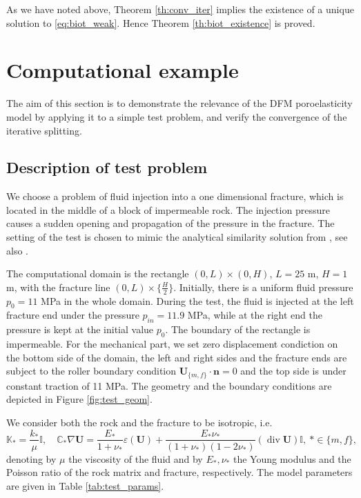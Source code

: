 \documentclass[a4paper]{article}
\numberwithin{equation}{section}
\def\div{\operatorname{div}}
\def\nn{\vc n}
\def\tn#1{{\mathbb{#1}}}    %
\def\U{\vc U}
\def\vc#1{\mathbf{#1}}     %
\newcommand{\eq}[1]{\begin{equation}#1\end{equation}}
\begin{document}
% 
As we have noted above, Theorem \ref{th:conv_iter} implies the existence of a unique solution to \eqref{eq:biot_weak}.
Hence Theorem \ref{th:biot_existence} is proved.


\section{Computational example}\label{sec:comp_test}

The aim of this section is to demonstrate the relevance of the DFM poroelasticity model by applying it to a simple test problem, and verify the convergence of the iterative splitting.

\subsection{Description of test problem}
We choose a problem of fluid injection into a one dimensional fracture, which is located in the middle of a block of impermeable rock.
The injection pressure causes a sudden opening and propagation of the pressure in the fracture.
The setting of the test is chosen to mimic the analytical similarity solution from \cite{Wijesinghe1986}, see also \cite{Watanabe2012lower}.

The computational domain is the rectangle $(0,L)\times(0,H)$, $L=25$ m, $H=1$ m, with the fracture line $(0,L)\times\{\tfrac H2\}$.
Initially, there is a uniform fluid pressure $p_0=11$ MPa in the whole domain.
During the test, the fluid is injected at the left fracture end under the pressure $p_{in}=11.9$ MPa, while at the right end the pressure is kept at the initial value $p_0$.
The boundary of the rectangle is impermeable.
For the mechanical part, we set zero displacement condiction on the bottom side of the domain, the left and right sides and the fracture ends are subject to the roller boundary condition $\U_{\{m,f\}}\cdot\nn=0$ and the top side is under constant traction of 11 MPa.
The geometry and the boundary conditions are depicted in Figure \ref{fig:test_geom}.

We consider both the rock and the fracture to be isotropic, i.e.
% 
\eq{ \tn K_*=\frac{k_*}{\mu}\tn I, \quad \tn C_*\nabla\U =\frac{E_*}{1+\nu_*}\varepsilon(\U)+\frac{E_*\nu_*}{(1+\nu_*)(1-2\nu_*)}(\div\U)\tn I, ~*\in\{m,f\}, }
% 
denoting by $\mu$ the viscosity of the fluid and by $E_*,\nu_*$ the Young modulus and the Poisson ratio of the rock matrix and fracture, respectively.
The model parameters are given in Table \ref{tab:test_params}.
\end{document}
